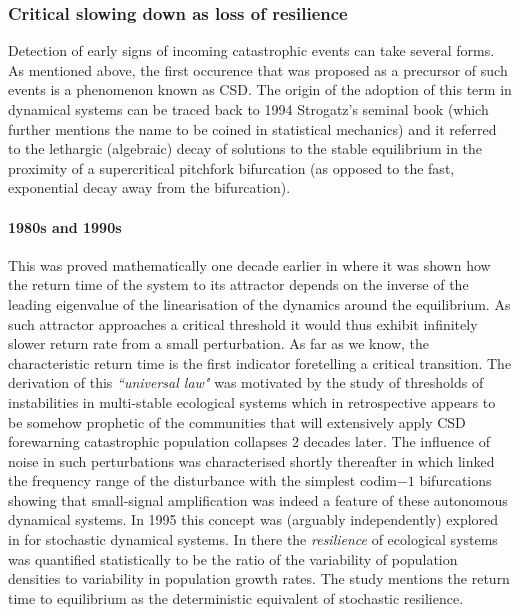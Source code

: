 \documentclass[../main.tex]{subfiles}
\begin{document}
\subsubsection{Critical slowing down as loss of resilience}\label{subsubsec1.2.1}
Detection of early signs of incoming catastrophic events can take several forms. As mentioned above, the first occurence that was proposed as a precursor of such events is a phenomenon known as CSD.
The origin of the adoption of this term in dynamical systems can be traced back to 1994 Strogatz's seminal book \cite{Strogatz94} (which further mentions the name to be coined in statistical mechanics) and it referred to the lethargic (algebraic) decay of solutions to the stable equilibrium in the proximity of a supercritical pitchfork bifurcation (as opposed to the fast, exponential decay away from the bifurcation). 
\paragraph{1980s and 1990s}
This was proved mathematically one decade earlier in \cite{Wissel84} where it was shown how the return time of the system to its attractor depends on the inverse of the leading eigenvalue of the linearisation of the dynamics around the equilibrium.
As such attractor approaches a critical threshold it would thus exhibit infinitely slower return rate from a small perturbation.
As far as we know, the characteristic return time is the first indicator foretelling a critical transition.
The derivation of this \textit{``universal law"} was motivated by the study of thresholds of instabilities in multi-stable ecological systems \cite{May77} which in retrospective appears to be somehow prophetic of the communities that will extensively apply CSD forewarning catastrophic population collapses 2 decades later.
The influence of noise in such perturbations was characterised shortly thereafter in \cite{Wiesenfeld86} which linked the frequency range of the disturbance with the simplest codim$-1$ bifurcations showing that small-signal amplification was indeed a feature of these autonomous dynamical systems.
In 1995 this concept was (arguably independently) explored in \cite{Ives95} for stochastic dynamical systems. 
In there the \textit{resilience} of ecological systems was quantified statistically to be the ratio of the variability of population densities to variability in population growth rates. The study mentions the return time to equilibrium as the deterministic equivalent of stochastic resilience.
\end{document}
